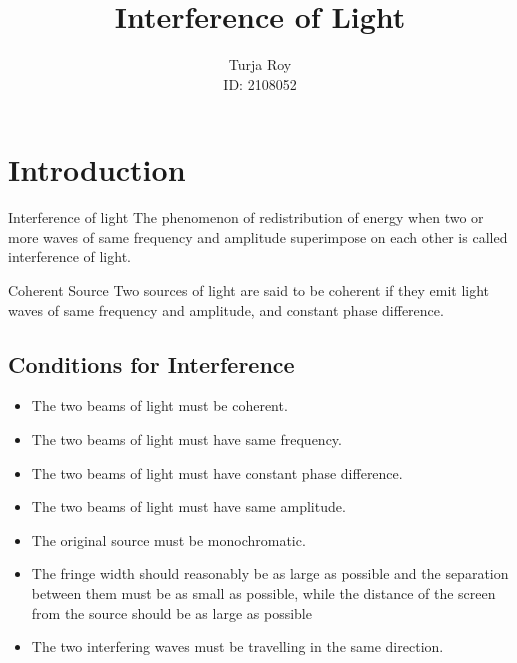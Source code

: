 \documentclass[12pt]{article}
\title{
    \textbf{Interference of Light}
}
\author{
    Turja Roy \\
    ID: 2108052
}
\date{}
\begin{document}
\maketitle
\tableofcontents
\newpage

\section{Introduction}
\begin{definition}{Interference of light}{}
    The phenomenon of redistribution of energy when two or more waves of same frequency and amplitude superimpose on each other is called interference of light.
\end{definition}

\begin{definition}{Coherent Source}{}
    Two sources of light are said to be coherent if they emit light waves of same frequency and amplitude, and constant phase difference.
\end{definition}

\subsection{Conditions for Interference}
\begin{itemize}
    \item The two beams of light must be coherent.
    \item The two beams of light must have same frequency.
    \item The two beams of light must have constant phase difference.
    \item The two beams of light must have same amplitude.
    \item The original source must be monochromatic.
    \item The fringe width should reasonably be as large as possible and the separation between them must be as small as possible, while the distance of the screen from the source should be as large as possible
    \item The two interfering waves must be travelling in the same direction.
\end{itemize}
\end{document}
